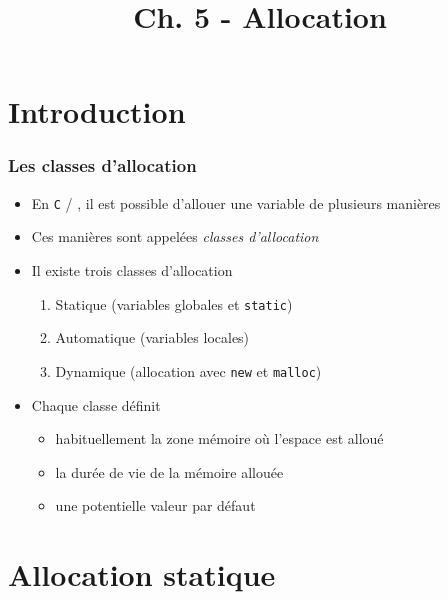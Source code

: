 


\title{Ch. 5 - Allocation}




\section{Introduction}

\begin{frame}
\frametitle{Les classes d'allocation}
\begin{itemize}[<+->]
\item En \texttt{C} / \cpp, il est possible d'allouer une variable de plusieurs manières
\item Ces manières sont appelées \emph{classes d'allocation}
\item Il existe trois classes d'allocation
	\begin{enumerate}
	\item Statique (variables globales et \lstinline|static|)
	\item Automatique (variables locales)
	\item Dynamique (allocation avec \lstinline|new| et \texttt{malloc})
	\end{enumerate}
\item Chaque classe définit
	\begin{itemize}
	\item habituellement la zone mémoire où l'espace est alloué
	\item la durée de vie de la mémoire allouée
	\item une potentielle valeur par défaut
	\end{itemize}
\end{itemize}
\end{frame}


\section{Allocation statique}

